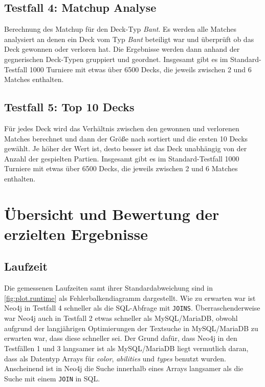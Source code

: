 \subsection{Testfall 4: Matchup Analyse}
Berechnung des Matchup für den Deck-Typ \emph{Bant}. Es werden alle Matches analysiert an denen ein Deck vom Typ \emph{Bant} beteiligt war und überprüft ob das Deck gewonnen oder verloren hat. Die Ergebnisse werden dann anhand der gegnerischen Deck-Typen gruppiert und geordnet. Insgesamt gibt es im Standard-Testfall 1000 Turniere mit etwas über 6500 Decks, die jeweils zwischen 2 und 6 Matches enthalten.  

\subsection{Testfall 5: Top 10 Decks}
Für jedes Deck wird das Verhältnis zwischen den gewonnen und verlorenen Matches berechnet und dann der Größe nach sortiert und die ersten 10 Decks gewählt. Je höher der Wert ist, desto besser ist das Deck unabhängig von der Anzahl der gespielten Partien. Insgesamt gibt es im Standard-Testfall 1000 Turniere mit etwas über 6500 Decks, die jeweils zwischen 2 und 6 Matches enthalten. 

\section{Übersicht und Bewertung der erzielten Ergebnisse}
\subsection{Laufzeit}
Die gemessenen Laufzeiten samt ihrer Standardabweichung sind in \autoref{fig:plot.runtime} als Fehlerbalkendiagramm dargestellt. Wie zu erwarten war ist Neo4j in Testfall 4 schneller als die SQL-Abfrage mit \verb|JOINS|. Überraschenderweise war Neo4j auch in Testfall 2 etwas schneller als MySQL/MariaDB, obwohl aufgrund der langjährigen Optimierungen der Textsuche in MySQL/MariaDB zu erwarten war, dass diese schneller sei. Der Grund dafür, dass Neo4j in den Testfällen 1 und 3 langsamer ist als MySQL/MariaDB liegt vermutlich daran, dass als Datentyp Arrays für \emph{color}, \emph{abilities} und \emph{types} benutzt wurden. Anscheinend ist in Neo4j die Suche innerhalb eines Arrays langsamer als die Suche mit einem \verb|JOIN| in SQL.

